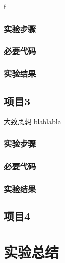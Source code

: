 f
\subsubsection{实验步骤}
\subsubsection{必要代码}
\subsubsection{实验结果}

\subsection{项目3}
大致思想 blablabla
\subsubsection{实验步骤}
\subsubsection{必要代码}
\subsubsection{实验结果}

\subsection{项目4}

\section{实验总结}


